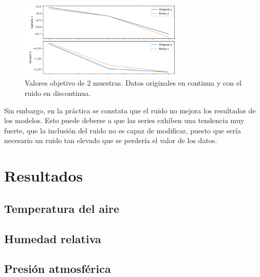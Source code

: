 \begin{figure}[H]
    \centering
    \includegraphics[width=0.7\textwidth]{images/noise_y.png}
    \caption{Valores objetivo de 2 muestras. Datos originales en continua y con el ruido en discontinua.}
    \label{noise2}
\end{figure}

Sin embargo, en la práctica se constata que el ruido no mejora los resultados de los modelos. Esto puede deberse a que las series exhiben una tendencia muy fuerte, 
que la inclusión del ruido no es capaz de modificar, puesto que sería necesario un ruido tan elevado que se perdería el valor de los datos.

\section{Resultados}
\subsection{Temperatura del aire}
\subsection{Humedad relativa}
\subsection{Presión atmosférica}

